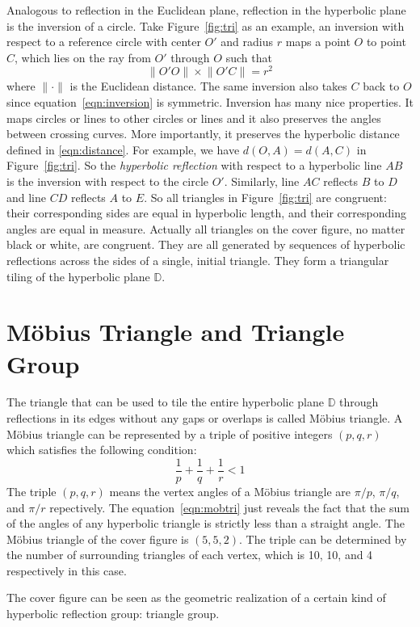 \documentclass[12pt]{article}
\begin{document}
Analogous to reflection in the Euclidean plane, reflection in the
hyperbolic plane is the inversion of a circle. Take
Figure~\ref{fig:tri} as an example, an inversion with respect to a
reference circle with center $O'$ and radius $r$ maps a point $O$ to
point $C$, which lies on the ray from $O'$ through $O$ such that
\begin{equation}\label{eqn:inversion}
  \lVert O'O \rVert \times \lVert O'C \rVert= r^2
\end{equation}
where $\lVert \cdot \rVert$ is the Euclidean distance. The same
inversion also takes $C$ back to $O$ since
equation~\eqref{eqn:inversion} is symmetric. Inversion has many nice
properties. It maps circles or lines to other circles or lines and it
also preserves the angles between crossing curves. More importantly,
it preserves the hyperbolic distance defined in
\eqref{eqn:distance}. For example, we have $d(O, A)=d(A, C)$ in
Figure~\ref{fig:tri}. So the \emph{hyperbolic reflection} with respect
to a hyperbolic line $AB$ is the inversion with respect to the circle
$O'$. Similarly, line $AC$ reflects $B$ to $D$ and line $CD$ reflects
$A$ to $E$. So all triangles in Figure~\ref{fig:tri} are congruent:
their corresponding sides are equal in hyperbolic length, and their
corresponding angles are equal in measure. Actually all triangles on
the cover figure, no matter black or white, are congruent. They are
all generated by sequences of hyperbolic reflections across the sides
of a single, initial triangle. They form a triangular tiling of the
hyperbolic plane $\mathbb{D}$.

\section{M\"obius Triangle and Triangle Group}

The triangle that can be used to tile the entire hyperbolic plane
$\mathbb{D}$ through reflections in its edges without any gaps or
overlaps is called M\"obius triangle. A M\"obius triangle can be
represented by a triple of positive integers $(p, q, r)$ which
satisfies the following condition:
\begin{equation}\label{eqn:mobtri}
  \frac{1}{p} + \frac{1}{q} + \frac{1}{r} < 1
\end{equation}
The triple $(p, q, r)$ means the vertex angles of a M\"obius triangle
are $\pi/p$, $\pi/q$, and $\pi/r$ repectively. The
equation~\eqref{eqn:mobtri} just reveals the fact that the sum of the
angles of any hyperbolic triangle is strictly less than a straight
angle. The M\"obius triangle of the cover figure is $(5, 5, 2)$. The
triple can be determined by the number of surrounding triangles of
each vertex, which is 10, 10, and 4 respectively in this case.

The cover figure can be seen as the geometric realization of a certain
kind of hyperbolic reflection group: triangle group.



\end{document}
